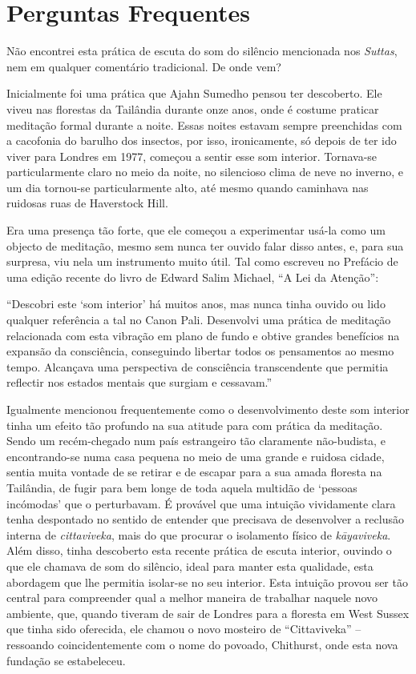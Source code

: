 \chapter{Perguntas Frequentes}

 Não encontrei esta prática de escuta do som do silêncio mencionada
nos \emph{Suttas}, nem em qualquer comentário tradicional. De onde vem?

\smallskip
\noindent
{} Inicialmente foi uma prática que Ajahn Sumedho pensou ter descoberto.
Ele viveu nas florestas da Tailândia durante onze anos, onde é costume
praticar meditação formal durante a noite. Essas noites estavam sempre
preenchidas com a cacofonia do barulho dos insectos, por isso,
ironicamente, só depois de ter ido viver para Londres em 1977, começou a
sentir esse som interior. Tornava-se particularmente claro no meio da
noite, no silencioso clima de neve no inverno, e um dia tornou-se
particularmente alto, até mesmo quando caminhava nas ruidosas ruas de
Haverstock Hill.

Era uma presença tão forte, que ele começou a experimentar usá-la como um
objecto de meditação, mesmo sem nunca ter ouvido falar disso antes, e, para sua
surpresa, viu nela um instrumento muito útil. Tal como escreveu no Prefácio de
uma edição recente do livro de Edward Salim Michael, ``A Lei da
Atenção''\cite{attention}:

``Descobri este `som interior' há muitos anos, mas nunca tinha ouvido ou
lido qualquer referência a tal no Canon Pali. Desenvolvi uma prática de
meditação relacionada com esta vibração em plano de fundo e obtive
grandes benefícios na expansão da consciência, conseguindo libertar
todos os pensamentos ao mesmo tempo. Alcançava uma perspectiva de
consciência transcendente que permitia reflectir nos estados mentais que
surgiam e cessavam.''

Igualmente mencionou frequentemente como o desenvolvimento deste som
interior tinha um efeito tão profundo na sua atitude para com prática da
meditação. Sendo um recém-chegado num país estrangeiro tão claramente
não-budista, e encontrando-se numa casa pequena no meio de uma grande e
ruidosa cidade, sentia muita vontade de se retirar e de escapar para a
sua amada floresta na Tailândia, de fugir para bem longe de toda aquela
multidão de `pessoas incómodas' que o perturbavam. É provável que uma
intuição vividamente clara tenha despontado no sentido de entender que
precisava de desenvolver a reclusão interna de \emph{cittaviveka}, mais
do que procurar o isolamento físico de \emph{kāyaviveka}. Além disso,
tinha descoberto esta recente prática de escuta interior, ouvindo o que
ele chamava de som do silêncio, ideal para manter esta qualidade, esta
abordagem que lhe permitia isolar-se no seu interior. Esta intuição
provou ser tão central para compreender qual a melhor maneira de
trabalhar naquele novo ambiente, que, quando tiveram de sair de Londres
para a floresta em West Sussex que tinha sido oferecida, ele chamou o
novo mosteiro de ``Cittaviveka'' -- ressoando coincidentemente com o
nome do povoado, Chithurst, onde esta nova fundação se estabeleceu.

